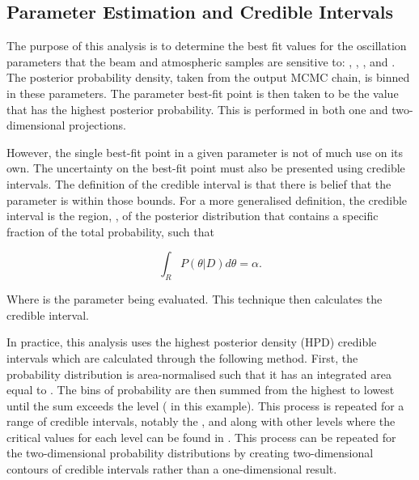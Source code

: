 \subsection{Parameter Estimation and Credible Intervals}
\label{sec:MarkovChainMonteCarlo_ParameterEstimation}

The purpose of this analysis is to determine the best fit values for the oscillation parameters that the beam and atmospheric samples are sensitive to: , , , and .
The posterior probability density, taken from the output MCMC chain, is binned in these parameters. The parameter best-fit point is then taken to be the value that has the highest posterior probability. This is performed in both one and two-dimensional projections.

However, the single best-fit point in a given parameter is not of much use on its own. The uncertainty on the best-fit point must also be presented using credible intervals. The definition of the \quickmath{1\sigma} credible interval is that there is  belief that the parameter is within those bounds. For a more generalised definition, the credible interval is the region, , of the posterior distribution that contains a specific fraction of the total probability, such that

\begin{equation}
\int_{R} P(\theta|D)d\theta = \alpha.
\end{equation}

Where \quickmath{\theta} is the parameter being evaluated. This technique then calculates the  credible interval.

In practice, this analysis uses the highest posterior density (HPD) credible intervals which are calculated through the following method. First, the probability distribution is area-normalised such that it has an integrated area equal to . The bins of probability are then summed from the highest to lowest until the sum exceeds the \quickmath{1\sigma} level ( in this example). This process is repeated for a range of credible intervals, notably the \quickmath{1\sigma}, \quickmath{2\sigma} and \quickmath{3\sigma} along with other levels where the critical values for each level can be found in \cite{Particle_Data_Group2020-ms}. This process can be repeated for the two-dimensional probability distributions by creating two-dimensional contours of credible intervals rather than a one-dimensional result. 

